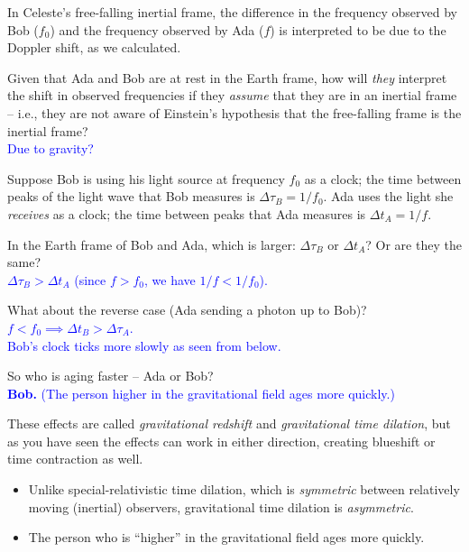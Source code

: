 \documentclass[11pt, letterpaper, openany]{book}
\newenvironment{exercise}[1][Exercise]{%
  \tcolorbox[blanker, breakable, left=1em,
    before skip=1em, after skip=1em,
    borderline west={3pt}{0pt}{PhysNavy},
    colback=PhysCream,
    before upper={\textcolor{PhysNavy}{\sffamily\bfseries #1:}\space}
  ]%
}{%
  \endtcolorbox%
}
\begin{document}
In Celeste's free-falling inertial frame, the difference in the frequency observed by Bob ($f_0$) and the frequency observed by Ada ($f$) is interpreted to be due to the Doppler shift, as we calculated.

\begin{exercise}[Exercise 9]
Given that Ada and Bob are at rest in the Earth frame, how will \textit{they} interpret the shift in observed frequencies if they \textit{assume} that they are in an inertial frame -- i.e., they are not aware of Einstein's hypothesis that the free-falling frame is the inertial frame? \\
\textcolor{blue}{Due to gravity?}
\end{exercise}

Suppose Bob is using his light source at frequency $f_0$ as a clock; the time between peaks of the light wave that Bob measures is $\Delta\tau_B = 1/f_0$. Ada uses the light she \textit{receives} as a clock; the time between peaks that Ada measures is $\Delta t_A = 1/f$.

\begin{exercise}[Exercise 10]
In the Earth frame of Bob and Ada, which is larger: $\Delta\tau_B$ or $\Delta t_A$? Or are they the same? \\
\textcolor{blue}{$\Delta\tau_B > \Delta t_A$ (since $f > f_0$, we have $1/f < 1/f_0$).}
\end{exercise}

\begin{exercise}[Exercise 11]
What about the reverse case (Ada sending a photon up to Bob)? \\
\textcolor{blue}{$f < f_0 \implies \Delta t_B > \Delta\tau_A$. \\
Bob's clock ticks more slowly as seen from below.}
\end{exercise}

\begin{exercise}[Exercise 12]
So who is aging faster -- Ada or Bob? \\
\textcolor{blue}{\textbf{Bob.} (The person higher in the gravitational field ages more quickly.)}
\end{exercise}

These effects are called \textit{gravitational redshift} and \textit{gravitational time dilation}, but as you have seen the effects can work in either direction, creating blueshift or time contraction as well.

\begin{itemize}
    \item Unlike special-relativistic time dilation, which is \textit{symmetric} between relatively moving (inertial) observers, gravitational time dilation is \textit{asymmetric}.
    \item The person who is ``higher'' in the gravitational field ages more quickly.
\end{itemize}
\end{document}
